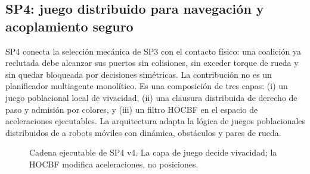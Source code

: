 \subsection{SP4: juego distribuido para navegación y acoplamiento seguro}
\label{subsec:sp4-v4-metodo}

SP4 conecta la selección mecánica de SP3 con el contacto físico: una coalición ya
reclutada debe alcanzar sus puertos sin colisiones, sin exceder torque de rueda y sin
quedar bloqueada por decisiones simétricas. La contribución no es un planificador
multiagente monolítico. Es una composición de tres capas: (i) un juego poblacional
local de vivacidad, (ii) una clausura distribuida de derecho de paso y admisión por
colores, y (iii) un filtro HOCBF en el espacio de aceleraciones ejecutables. La
arquitectura adapta la lógica de juegos poblacionales distribuidos de
\citet{quijano2017population,martinezpiazuelo2022automatica} a robots móviles con
dinámica, obstáculos y pares de rueda.

\begin{figure}[H]
\centering
{}
\caption{Cadena ejecutable de SP4 v4. La capa de juego decide vivacidad; la HOCBF
modifica aceleraciones, no posiciones.}
\label{fig:sp4-v4-chain}
\end{figure}

